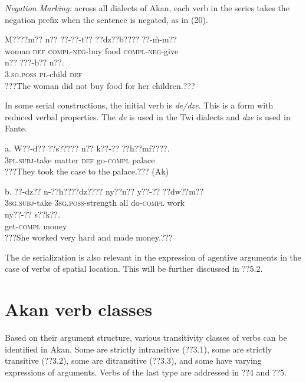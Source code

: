 \documentclass[output=paper]{langsci/langscibook}
\begin{document}
\begin{styleListei}
\emph{Negation Marking:} across all dialects of Akan, each verb in the series takes the negation prefix when the sentence is negated, as in (20). 
\end{styleListei}

\ea
\gll M????m??  n??  ??-??-t??      ??dz??b????  ??-\`{m}-m??  \\
     woman  \textsc{def}  \textsc{compl}{}-\textsc{neg}{}-buy  food    \textsc{compl}{}-\textsc{neg}{}-give\\
\gll n??    ???-b??    n??.\\
     \textsc{3.sg.poss}  \textsc{pl}{}-child  \textsc{def}\\
\glt ???The woman did not buy food for her children.???
\z

In some serial constructions, the initial verb is \emph{de/dze}. This is a form with reduced verbal properties. The \emph{de }is used in the Twi dialects and \emph{dze} is used in Fante. 

\ea
\gll a.  W??-d??    ??s?????  n??  k??-??    ??h??mf????.\\
       \textsc{3pl.subj}{}-take  matter  \textsc{def}  go-\textsc{compl}  palace\\
\glt   ???They took the case to the palace.??? (Ak)
\z

\ea
\gll  b.  ??{}-dz??    n-??h????dz????    ny??n??  y??-??     ??dw??m?? \\
       \textsc{3sg.subj}{}-take  \textsc{3sg.poss}{}-strength  all  do-\textsc{compl}  work\\
\gll   ny??-??    s??k??.\\
       get-\textsc{compl}  money\\
\glt   ???She worked very hard and made money.???
\z

The de serialization is also relevant in the expression of agentive arguments in the case of verbs of spatial location. This will be further discussed in ??5.2.

\section{Akan verb classes}

Based on their argument structure, various transitivity classes of verbs can be identified in Akan. Some are strictly intransitive (??3.1), some are strictly transitive (??3.2), some are ditransitive (??3.3), and some have varying expressions of arguments. Verbs of the last type are addressed in ??4 and ??5.
\end{document}
